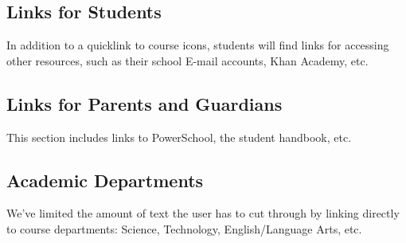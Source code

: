 \documentclass[letterpaper,10pt,english]{sphinxmanual}
\begin{document}
\subsection{Links for Students}
\label{moodle:links-for-students}
In addition to a quicklink to course icons, students will find links for accessing other resources, such as their school E-mail accounts, Khan Academy, etc.

{\hfill{}\hfill}


\subsection{Links for Parents and Guardians}
\label{moodle:links-for-parents-and-guardians}
This section includes links to PowerSchool, the student handbook, etc.

{\hfill{}\hfill}


\subsection{Academic Departments}
\label{moodle:academic-departments}
We've limited the amount of text the user has to cut through by linking directly to course departments: Science, Technology, English/Language Arts, etc.
\end{document}
